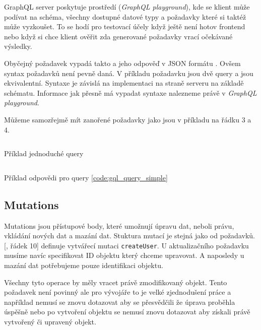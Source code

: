 GraphQL server poskytuje prostředí (\textit{GraphQL playground}), kde se klient může podívat na schéma, všechny dostupné datové typy a požadavky které si taktéž může vyzkoušet. To se hodí pro testovací účely když ještě není hotov frontend nebo když si chce klient ověřit zda generované požadavky vrací očekávané výsledky.

Obyčejný požadavek vypadá takto  a jeho odpověď v JSON formátu .
Ovšem syntax požadavků není pevně daná. V příkladu požadavku jsou dvě query a jsou ekvivalentní. Syntaxe je závislá na implementaci na straně serveru na základě schématu. Informace jak přesně má vypadat syntaxe nalezneme právě v \textit{GraphQL playground}.

Můžeme samozřejmě mít zanořené požadavky jako jsou v příkladu  na řádku 3 a 4.

\begin{listing}[H]
    \inputminted[]{graphql}{resources/code/standards/query.example.gql}
    \caption{Příklad jednoduché query}
    \label{code:gql_query_simple}
\end{listing}

\begin{listing}[H]
    \inputminted[]{json}{resources/code/standards/query.example.gql.jsonc}
    \caption{Příklad odpovědi pro query \ref{code:gql_query_simple}}
    \label{code:gql_query_simple_response}
\end{listing}

\subsection{Mutations}\label{sec:graphql:mutations}
Mutations jsou přístupové body, které umožnují úpravu dat, neboli právu, vkládání nových dat a mazání dat. Stuktura mutací je stejná jako od požadavků. [, řádek 10] definuje vytvářecí mutaci \texttt{createUser}. U aktualizačního požadavku musíme navíc specifikovat ID objektu který chceme upravovat. A naposledy u mazání dat potřebujeme pouze identifikaci objektu. \cite{graphqlMutations}

Všechny tyto operace by měly vracet právě zmodifikovaný objekt. Tento požadavek není povinný ale pro vývojáře to je velké zjednodušení práce a například nemusí se znovu dotazovat aby se přesvědčili že úprava proběhla úspěšně nebo po vytvoření objektu se nemusí znovu dotazovat aby získali právě vytvořený či upravený objekt.

